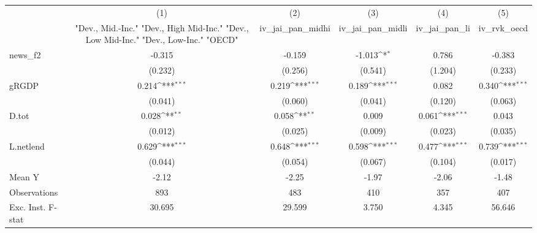 {
\def\sym#1{\ifmmode^{#1}\else\(^{#1}\)\fi}
\begin{tabular}{l*{5}{c}}
\toprule
            &\multicolumn{1}{c}{(1)}&\multicolumn{1}{c}{(2)}&\multicolumn{1}{c}{(3)}&\multicolumn{1}{c}{(4)}&\multicolumn{1}{c}{(5)}\\
            &\multicolumn{1}{c}{ "Dev., Mid.-Inc." "Dev., High Mid-Inc." "Dev., Low Mid-Inc." "Dev., Low-Inc." "OECD" }&\multicolumn{1}{c}{iv\_jai\_pan\_midhi}&\multicolumn{1}{c}{iv\_jai\_pan\_midli}&\multicolumn{1}{c}{iv\_jai\_pan\_li}&\multicolumn{1}{c}{iv\_rvk\_oecd}\\
\midrule
news\_f2     &      -0.315         &      -0.159         &      -1.013\sym{*}  &       0.786         &      -0.383         \\
            &     (0.232)         &     (0.256)         &     (0.541)         &     (1.204)         &     (0.233)         \\
\addlinespace
gRGDP       &       0.214\sym{***}&       0.219\sym{***}&       0.189\sym{***}&       0.082         &       0.340\sym{***}\\
            &     (0.041)         &     (0.060)         &     (0.041)         &     (0.120)         &     (0.063)         \\
\addlinespace
D.tot       &       0.028\sym{**} &       0.058\sym{**} &       0.009         &       0.061\sym{***}&       0.043         \\
            &     (0.012)         &     (0.025)         &     (0.009)         &     (0.023)         &     (0.035)         \\
\addlinespace
L.netlend   &       0.629\sym{***}&       0.648\sym{***}&       0.598\sym{***}&       0.477\sym{***}&       0.739\sym{***}\\
            &     (0.044)         &     (0.054)         &     (0.067)         &     (0.104)         &     (0.017)         \\
\midrule
Mean Y      &       -2.12         &       -2.25         &       -1.97         &       -2.06         &       -1.48         \\
Observations&         893         &         483         &         410         &         357         &         407         \\
Exc. Inst. F-stat&      30.695         &      29.599         &       3.750         &       4.345         &      56.646         \\
\bottomrule
\end{tabular}
}

